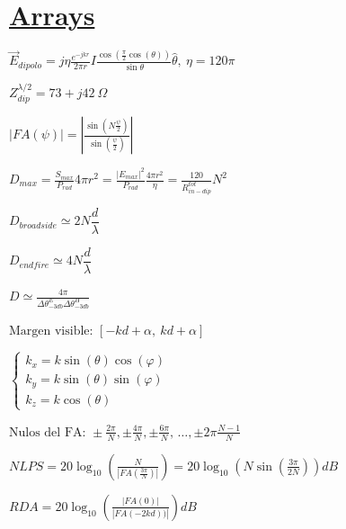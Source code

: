 \documentclass[twocolumn, 8pt]{extarticle}
\begin{document}
\section*{\underline{Arrays}}
\( \vec{E}_{dipolo} = j \eta \frac{ e^{-jkr} }{ 2 \pi r } I \frac{ \cos\left(\frac{\pi}{2} \cos(\theta)\right) }{\sin{\theta}} \hat{\theta},\ \eta = 120\pi \)

\vspace{0.5cm}
\( Z_{dip}^{\lambda / 2} = 73 + j42 \  \Omega \)

\vspace{0.5cm}
\( \left|FA(\psi)\right| = \left|\frac{ \sin(N \frac{\psi}{2}) }{ \sin(\frac{\psi}{2}) } \right|\)

\vspace{0.5cm}
\( D_{max} = \frac{ S_{max} }{ P_{rad}} 4\pi r^2  = \frac{ \left|E_{max}\right|^2 }{ P_{rad}} \frac{4\pi r^2}{\eta} = \frac{120}{R^{tot}_{in-dip}}N^2 \)

\vspace{0.5cm}
\( D_{broadside} \simeq  2N \dfrac{d}{\lambda}\)

\vspace{0.5cm}
\( D_{endfire} \simeq  4N \dfrac{d}{\lambda}\)

\vspace{0.5cm}
\( D \simeq \frac{4\pi}{\Delta\theta_{-3db}^{E} \Delta\theta_{-3db}^{H}} \)

\vspace{0.5cm}
\( \text{Margen visible: } [-kd + \alpha,\ kd + \alpha] \)

\vspace{0.5cm}
\(\left \{
\begin{array}{l}
	k_x = k \sin(\theta) \cos(\varphi) \\
	k_y = k \sin(\theta) \sin(\varphi) \\
	k_z = k \cos(\theta)
\end{array}
\right .
\)

\vspace{0.5cm}
\( \text{Nulos del FA: } \pm\frac{ 2\pi }{ N }, \pm\frac{ 4\pi }{ N }, \pm\frac{ 6\pi }{ N }, \, \dots  ,\pm2\pi \frac{N - 1}{N} \)

\vspace{0.5cm}
\( NLPS = 20 \log_{10} \left(\frac{ N }{\left|FA\left(\frac{ 3\pi }{ N }\right)\right|} \right) = 20 \log_{10} \left(N \sin\left( \frac{ 3\pi }{ 2N }\right)\right) dB \)

\vspace{0.5cm}
\( RDA = 20 \log_{10} \left( \frac{ \left|FA(0)\right| }{ \left|FA(-2kd))\right| } \right) dB \)
\end{document}
